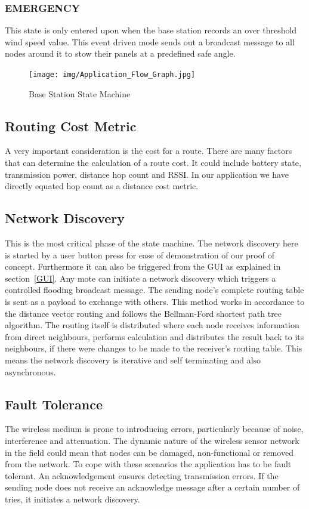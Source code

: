 \documentclass[conference]{IEEEtran}
\begin{document}
\subsubsection{EMERGENCY} \label{EMERGENCY}
This state is only entered upon when the base station records an over threshold wind speed value. This event driven mode sends out a broadcast message to all nodes around it to stow their panels at a predefined safe angle.

\begin{figure}[htbp]
    \texttt{[image: img/Application\_Flow\_Graph.jpg]}\centering
    \captionsetup{justification=centering}
    \caption{Base Station State Machine}
    \label{fig:StateMachine}
\end{figure}

\subsection{Routing Cost Metric} \label{Cost}
A very important consideration is the cost for a route. There are many factors that can determine the calculation of a route cost. It could include battery state, transmission power, distance hop count and RSSI. In our application we have directly equated hop count as a distance cost metric.

\subsection{Network Discovery} \label{NetDisc}
This is the most critical phase of the state machine. The network discovery here is started by a user button press for ease of demonstration of our proof of concept. Furthermore it can also be triggered from the GUI as explained in section~\ref{GUI}. Any mote can initiate a network discovery which triggers a controlled flooding broadcast message. The sending node's complete routing table is sent as a payload to exchange with others. This method works in accordance to the distance vector routing and follows the Bellman-Ford shortest path tree algorithm. The routing itself is distributed where each node receives information from direct neighbours, performs calculation and distributes the result back to its neighbours, if there were changes to be made to the receiver's routing table. This means the network discovery is iterative and self terminating and also asynchronous.

\subsection{Fault Tolerance} \label{FaultTol}
The wireless medium is prone to introducing errors, particularly because of noise, interference and attenuation. The dynamic nature of the wireless sensor network in the field could mean that nodes can be damaged, non-functional or removed from the network. To cope with these scenarios the application has to be fault tolerant. An acknowledgement ensures detecting transmission errors. If the sending node does not receive an acknowledge message after a certain number of tries, it initiates a network discovery.
\end{document}
